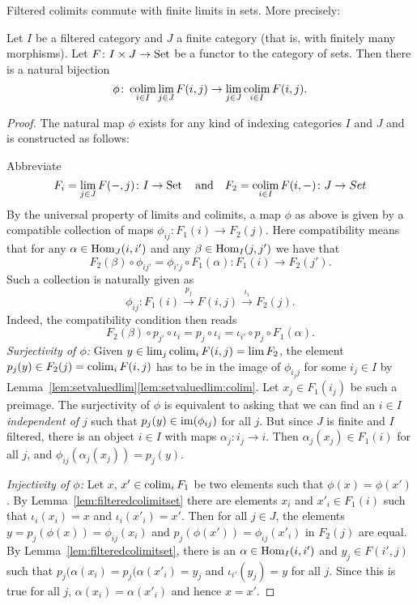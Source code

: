 \documentclass[a4paper,openany]{scrbook}
\begin{document}
\begin{lemma} \label{lemma:filteredcolimfinitelim}
Filtered colimits commute with finite limits in sets. More precisely:

Let $I$ be a filtered category and $J$ a finite category (that is, with finitely many morphisms). Let $F\colon I \times J \to \operatorname{Set}$ be a functor to the category of sets. Then there is a natural bijection
\[
\phi\colon \operatorname*{colim}_{i \in I} \lim_{j \in J} F(i,j) \to \lim_{j \in J} \operatorname*{colim}_{i \in I} F(i,j).
\]
\end{lemma}
\begin{proof}
The natural map $\phi$ exists for any kind of indexing categories $I$ and $J$ and is constructed as follows:

Abbreviate
\[
F_i = \lim_{j \in J} F(-,j)\colon I \to \operatorname{Set} \quad\text{and}\quad F_2 = \operatorname*{colim}_{i \in I} F(i,-)\colon J \to Set
\]
By the universal property of limits and colimits, a map $\phi$ as above is given by a compatible collection of maps $\phi_{ij}\colon F_1(i) \to F_2(j)$. Here compatibility means that for any $\alpha\in \operatorname{Hom}_J(i,i')$ and any $\beta\in \operatorname{Hom}_I(j,j')$ we have that
\[
F_2(\beta) \circ \phi_{ij'} = \phi_{i'j} \circ F_1(\alpha)\colon F_1(i) \to F_2(j').
\]
Such a collection is naturally given as
\[
\phi_{ij}\colon F_1(i) \xrightarrow{p_j} F(i,j) \xrightarrow{\iota_i} F_2(j).
\]
Indeed, the compatibility condition then reads
\[
F_2(\beta) \circ p_{j'} \circ \iota_i = p_j \circ \iota_i = \iota_{i'} \circ p_j \circ F_1(\alpha).
\]
\emph{Surjectivity of $\phi$:} Given $y \in \lim_j \operatorname*{colim}_i F(i,j) = \lim F_2$, the element $p_j(y) \in F_2(j) = \operatorname*{colim}_i F(i,j)$ has to be in the image of $\phi_{i_jj}$ for some $i_j \in I$ by Lemma~\ref{lem:setvaluedlim}\eqref{lem:setvaluedlim:colim}. Let $x_j \in F_1(i_j)$ be such a preimage. The surjectivity of $\phi$ is equivalent to asking that we can find an $i \in I$ \emph{independent of $j$} such that $p_j(y) \in \operatorname{im}(\phi_{ij})$ for all $j$. But since $J$ is finite and $I$ filtered, there is an object $i \in I$ with maps $\alpha_j \colon i_j \to i$. Then $\alpha_j(x_j) \in F_1(i)$ for all $j$, and $\phi_{ij}(\alpha_j(x_j)) = p_j(y)$.

\emph{Injectivity of $\phi$:} Let $x$, $x' \in \operatorname*{colim}_i F_1$ be two elements such that $\phi(x) = \phi(x')$. By Lemma~\ref{lem:filteredcolimitset} there are elements $x_i$ and $x'_i \in F_1(i)$ such that $\iota_i(x_i) = x$ and $\iota_i(x'_i) = x'$. Then for all $j \in J$, the elements $y = p_j(\phi(x)) = \phi_{ij}(x_i)$ and $p_j(\phi(x')) = \phi_{ij}(x'_i)$ in $F_2(j)$ are equal. By Lemma~\ref{lem:filteredcolimitset}, there is an $\alpha \in \operatorname{Hom}_I(i,i')$ and $y_j \in F(i',j)$ such that $p_j(\alpha(x_i) = p_j(\alpha(x'_i) = y_j$ and $\iota_{i'}(y_j) = y$ for all $j$. Since this is true for all $j$, $\alpha(x_i) = \alpha(x'_i)$ and hence $x=x'$.
\end{proof}

\nocite{milnor-stasheff}
\nocite{holme:royal-road}
\nocite{hatcher:K-theory}
\nocite{bruner-catanzaro-may}



\end{document}
